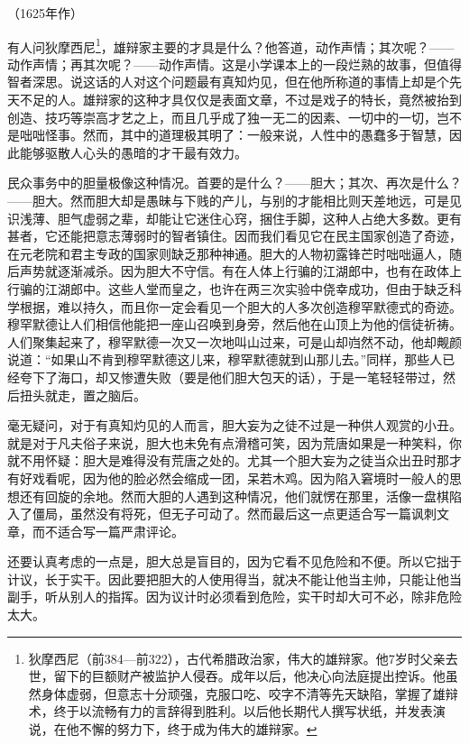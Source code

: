 \begin{center}
    （1625年作）
\end{center}
\par 有人问狄摩西尼\footnote{狄摩西尼（前384—前322），古代希腊政治家，伟大的雄辩家。他7岁时父亲去世，留下的巨额财产被监护人侵吞。成年以后，他决心向法庭提出控诉。他虽然身体虚弱，但意志十分顽强，克服口吃、咬字不清等先天缺陷，掌握了雄辩术，终于以流畅有力的言辞得到胜利。以后他长期代人撰写状纸，并发表演说，在他不懈的努力下，终于成为伟大的雄辩家。}，雄辩家主要的才具是什么？他答道，动作声情；其次呢？——动作声情；再其次呢？——动作声情。这是小学课本上的一段烂熟的故事，但值得智者深思。说这话的人对这个问题最有真知灼见，但在他所称道的事情上却是个先天不足的人。雄辩家的这种才具仅仅是表面文章，不过是戏子的特长，竟然被抬到创造、技巧等崇高才艺之上，而且几乎成了独一无二的因素、一切中的一切，岂不是咄咄怪事。然而，其中的道理极其明了：一般来说，人性中的愚蠢多于智慧，因此能够驱散人心头的愚暗的才干最有效力。
\par 民众事务中的胆量极像这种情况。首要的是什么？——胆大；其次、再次是什么？——胆大。然而胆大却是愚昧与下贱的产儿，与别的才能相比则天差地远，可是见识浅薄、胆气虚弱之辈，却能让它迷住心窍，捆住手脚，这种人占绝大多数。更有甚者，它还能把意志薄弱时的智者镇住。因而我们看见它在民主国家创造了奇迹，在元老院和君主专政的国家则缺乏那种神通。胆大的人物初露锋芒时咄咄逼人，随后声势就逐渐减杀。因为胆大不守信。有在人体上行骗的江湖郎中，也有在政体上行骗的江湖郎中。这些人堂而皇之，也许在两三次实验中侥幸成功，但由于缺乏科学根据，难以持久，而且你一定会看见一个胆大的人多次创造穆罕默德式的奇迹。穆罕默德让人们相信他能把一座山召唤到身旁，然后他在山顶上为他的信徒祈祷。人们聚集起来了，穆罕默德一次又一次地叫山过来，可是山却岿然不动，他却觍颜说道：“如果山不肯到穆罕默德这儿来，穆罕默德就到山那儿去。”同样，那些人已经夸下了海口，却又惨遭失败（要是他们胆大包天的话），于是一笔轻轻带过，然后扭头就走，置之脑后。
\par 毫无疑问，对于有真知灼见的人而言，胆大妄为之徒不过是一种供人观赏的小丑。就是对于凡夫俗子来说，胆大也未免有点滑稽可笑，因为荒唐如果是一种笑料，你就不用怀疑：胆大是难得没有荒唐之处的。尤其一个胆大妄为之徒当众出丑时那才有好戏看呢，因为他的脸必然会缩成一团，呆若木鸡。因为陷入窘境时一般人的思想还有回旋的余地。然而大胆的人遇到这种情况，他们就愣在那里，活像一盘棋陷入了僵局，虽然没有将死，但无子可动了。然而最后这一点更适合写一篇讽刺文章，而不适合写一篇严肃评论。
\par 还要认真考虑的一点是，胆大总是盲目的，因为它看不见危险和不便。所以它拙于计议，长于实干。因此要把胆大的人使用得当，就决不能让他当主帅，只能让他当副手，听从别人的指挥。因为议计时必须看到危险，实干时却大可不必，除非危险太大。




